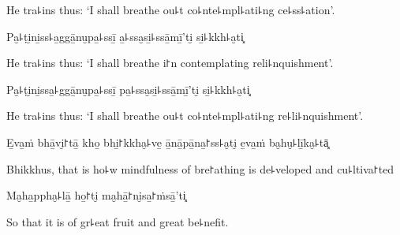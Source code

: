\begin{english}
  He tra꜕ins thus: `I shall breathe ou꜕t co꜕nte꜕mpl꜕ati꜕ng ce꜕ss꜕ation'.
\end{english}

Pa̮꜕ṭi̮ni̱ss꜕a̱ggā̱nu̮pa̱꜕ssī̱ a̱꜕ssa̮si̱꜕ssā̱mī̱'ti̮ si̱꜕kkh꜕a̮ti͓

\begin{english}
  He tra꜕ins thus: `I shall breathe i꜓n contemplating reli꜕nquishment'.
\end{english}

Pa̮꜕ṭi̮ni̱ssa̱꜕ggā̱nu̮pa̱꜕ssī̱ pa̱꜕ssa̮si̱꜕ssā̱mī̱'ti̮ si̱꜕kkh꜕a̮ti͓

\begin{english}
  He tra꜕ins thus: `I shall breathe ou꜕t co꜕nte꜕mpl꜕ati꜕ng re꜕li꜕nquishment'.
\end{english}

E̱va̱ṁ bhā̱vi̮꜓tā̱ kho̱ bhi̱꜓kkha̮꜕ve̱ ā̱nā̱pā̱na̱꜓ss꜕a̮ti̮ e̱va̱ṁ ba̮hu̮꜕lī̱ka̮꜕tā͓

\begin{english}
  Bhikkhus, that is ho꜕w mindfulness of bre꜓athing is de꜕veloped and cu꜕ltiva꜓ted
\end{english}

Ma̮ha̱ppha̮꜕lā̱ ho̱꜓ti̮ ma̮hā̱꜓ni̮sa̱꜓ṁsā̱'ti͓

\begin{english}
  So that it is of gr꜕eat fruit and great be꜕nefit.
\end{english}

